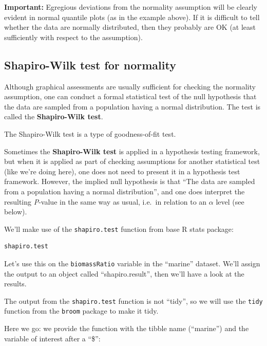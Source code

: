\documentclass[
]{book}
\newenvironment{Shaded}{\begin{snugshade}}{\end{snugshade}}
\newcommand{\FunctionTok}[1]{\textcolor[rgb]{0.13,0.29,0.53}{\textbf{#1}}}
\newcommand{\NormalTok}[1]{#1}
\newcommand{\OtherTok}[1]{\textcolor[rgb]{0.56,0.35,0.01}{#1}}
\newcommand{\SpecialCharTok}[1]{\textcolor[rgb]{0.81,0.36,0.00}{\textbf{#1}}}
\begin{document}
\textbf{Important: }
Egregious deviations from the normality assumption will be clearly evident in normal quantile plots (as in the example above). If it is difficult to tell whether the data are normally distributed, then they probably are OK (at least sufficiently with respect to the assumption).

\subsection{Shapiro-Wilk test for normality}\label{shapirottest}

Although graphical assessments are usually sufficient for checking the normality assumption, one can conduct a formal statistical test of the null hypothesis that the data are sampled from a population having a normal distribution. The test is called the \textbf{Shapiro-Wilk test}.

The Shapiro-Wilk test is a type of goodness-of-fit test.

Sometimes the \textbf{Shapiro-Wilk test} is applied in a hypothesis testing framework, but when it is applied as part of checking assumptions for another statistical test (like we're doing here), one does not need to present it in a hypothesis test framework. However, the implied null hypothesis is that ``The data are sampled from a population having a normal distribution'', and one does interpret the resulting \emph{P}-value in the same way as usual, i.e.~in relation to an \(\alpha\) level (see below).

We'll make use of the \texttt{shapiro.test} function from base R stats package:

\begin{verbatim}
shapiro.test
\end{verbatim}

Let's use this on the \texttt{biomassRatio} variable in the ``marine'' dataset. We'll assign the output to an object called ``shapiro.result'', then we'll have a look at the results.

The output from the \texttt{shapiro.test} function is not ``tidy'', so we will use the \texttt{tidy} function from the \texttt{broom} package to make it tidy.

Here we go: we provide the function with the tibble name (``marine'') and the variable of interest after a ``\$'':

\begin{Shaded}
\end{Shaded}
\end{document}
